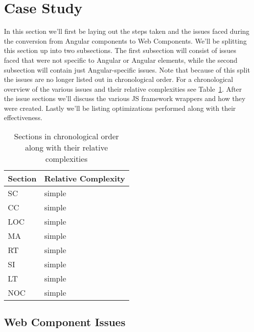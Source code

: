 \section{Case Study}\label{sec:case-study} 

In this section we'll first be laying out the steps taken and the issues faced during the conversion from Angular components to Web Components. We'll be splitting this section up into two subsections. The first subsection will consist of issues faced that were not specific to Angular or Angular elements, while the second subsection will contain just Angular-specific issues. Note that because of this split the issues are no longer listed out in chronological order. For a chronological overview of the various issues and their relative complexities see Table~\ref{tab:case-study:chronological-issues}. After the issue sections we'll discuss the various JS framework wrappers and how they were created. Lastly we'll be listing optimizations performed along with their effectiveness.

\begin{table}[h]
	\begin{tabularx}{\columnwidth}{X|l}
		\toprule
		\textbf{Section} & \textbf{Relative Complexity} \\ \midrule
		SC               & simple                       \\ \hline
		CC               & simple                       \\ \hline
		LOC              & simple                       \\ \hline
		MA               & simple                       \\ \hline
		RT               & simple                       \\ \hline
		SI               & simple                       \\ \hline
		LT               & simple                       \\ \hline
		NOC              & simple                       \\
	\end{tabularx}
	\caption{Sections in chronological order along with their relative complexities}
	\label{tab:case-study:chronological-issues}
\end{table}

\subsection{Web Component Issues}

